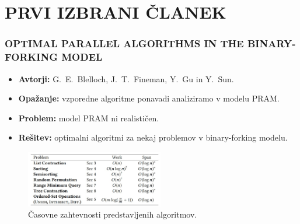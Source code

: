 \documentclass[a4paper, 12pt]{beamer}
\theoremstyle{definition}
\theoremstyle{plain}
\begin{document}

\section{PRVI IZBRANI ČLANEK}
\begin{frame}
    \frametitle{\small{OPTIMAL PARALLEL ALGORITHMS IN THE BINARY-FORKING MODEL}}
    \begin{itemize}
        \item \textbf{Avtorji:} G.~E.~Blelloch, J.~T.~Fineman, Y.~Gu in Y.~Sun.
        \item \textbf{Opažanje:} vzporedne algoritme ponavadi analiziramo v modelu PRAM.
        \item \textbf{Problem:} model PRAM ni realističen.
        \item \textbf{Rešitev:} optimalni algoritmi za nekaj problemov v binary-forking modelu.
    \end{itemize}
    \begin{figure}[H]
        \centering
        \includegraphics[width=60mm]{binary_forking.jpg}
        \caption{Časovne zahtevnosti predstavljenih algoritmov.}
    \end{figure}

\end{frame}


\end{document}
